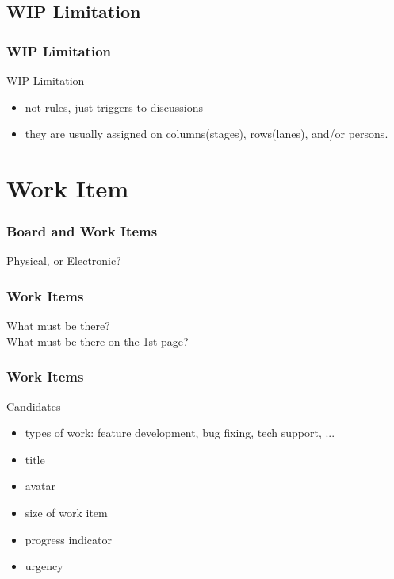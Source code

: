 \documentclass[lualatex]{beamer}
\begin{document}
\subsection{WIP Limitation}

\begin{frame}
  \frametitle{WIP Limitation}

  \begin{block}{WIP Limitation}
    \begin{itemize}
    \item not rules, just triggers to discussions
    \item they are usually assigned on columns(stages), rows(lanes), and/or persons.
    \end{itemize}
  \end{block}
\end{frame}

\section{Work Item}

\begin{frame}
  \frametitle{Board and Work Items}
  \begin{center}
    \Huge
    Physical, or Electronic?
  \end{center}
\end{frame}

\begin{frame}
  \frametitle{Work Items}
  \begin{center}
    \Large
    What must be there?
    \\
    What must be there on the 1st page?
  \end{center}
\end{frame}

\begin{frame}
  \frametitle{Work Items}

  \begin{block}{Candidates}
    \begin{itemize}
    \item types of work: feature development, bug fixing, tech support, ...
    \item title
    \item avatar
    \item size of work item
    \item progress indicator
    \item urgency
    \end{itemize}
  \end{block}
\end{frame}
\end{document}
